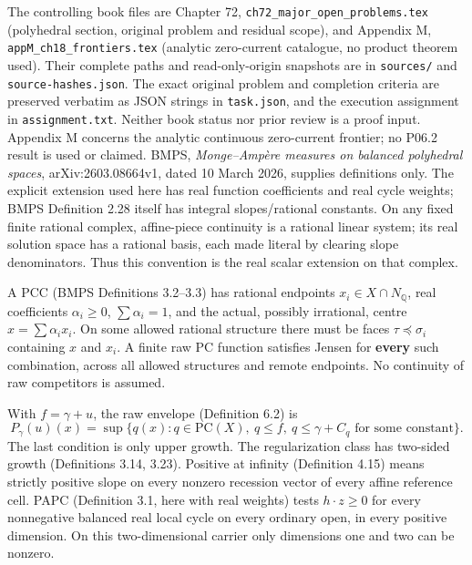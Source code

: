 \documentclass[
  11pt,
]{article}
\begin{document}
The controlling book files are Chapter 72,
\texttt{ch72\_major\_open\_problems.tex} (polyhedral section, original
problem and residual scope), and Appendix M,
\texttt{appM\_ch18\_frontiers.tex} (analytic zero-current catalogue, no
product theorem used). Their complete paths and read-only-origin
snapshots are in \texttt{sources/} and \texttt{source-hashes.json}. The
exact original problem and completion criteria are preserved verbatim as
JSON strings in \texttt{task.json}, and the execution assignment in
\texttt{assignment.txt}. Neither book status nor prior review is a proof
input. Appendix M concerns the analytic continuous zero-current
frontier; no P06.2 result is used or claimed. BMPS, \emph{Monge--Ampère
measures on balanced polyhedral spaces}, arXiv:2603.08664v1, dated 10
March 2026, supplies definitions only. The explicit extension used here
has real function coefficients and real cycle weights; BMPS Definition
2.28 itself has integral slopes/rational constants. On any fixed finite
rational complex, affine-piece continuity is a rational linear system;
its real solution space has a rational basis, each made literal by
clearing slope denominators. Thus this convention is the real scalar
extension on that complex.

A PCC (BMPS Definitions 3.2--3.3) has rational endpoints
\(x_i\in X\cap N_{\mathbb{Q}}\), real coefficients \(\alpha_i\geq0\),
\(\sum\alpha_i=1\), and the actual, possibly irrational, centre
\(x=\sum\alpha_i x_i\). On some allowed rational structure there must be
faces \(\tau\preceq\sigma_i\) containing \(x\) and \(x_i\). A finite raw
PC function satisfies Jensen for \textbf{every} such combination, across
all allowed structures and remote endpoints. No continuity of raw
competitors is assumed.

With \(f=\gamma+u\), the raw envelope (Definition 6.2) is \[
 P_\gamma(u)(x)=\sup\{q(x):q\in\mathrm{PC}(X),\ q\leq f,
                          \ q\leq\gamma+C_q\text{ for some constant}\}.
                                                               \tag{4}
\] The last condition is only upper growth. The regularization class has
two-sided growth (Definitions 3.14, 3.23). Positive at infinity
(Definition 4.15) means strictly positive slope on every nonzero
recession vector of every affine reference cell. PAPC (Definition 3.1,
here with real weights) tests \(h\cdot z\geq0\) for every nonnegative
balanced real local cycle on every ordinary open, in every positive
dimension. On this two-dimensional carrier only dimensions one and two
can be nonzero.
\end{document}
